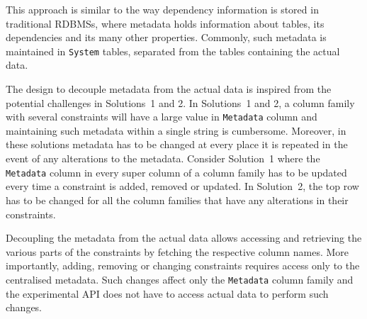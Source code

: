 This approach is similar to the way dependency information is
stored in traditional \acp{RDBMS},  where metadata holds information
about tables,  its dependencies and its many other properties.  Commonly,  such
metadata is maintained in \texttt{System} tables, separated from the
tables containing the actual data.  

The design to decouple metadata from the actual data is inspired from the
potential challenges in Solutions~1 and 2. 
In Solutions~1 and 2,   a column family with several constraints will have a
large value in \texttt{Metadata} column and maintaining such metadata within a
single string is cumbersome.
Moreover, in these solutions metadata has to be changed at every place it is repeated in the event of any alterations to
the metadata. 
Consider Solution~1 where the \texttt{Metadata} column in every super column
of a column family has to be updated every time a constraint is added,  removed
or updated. 
In Solution~2,  the top row has to be changed for all the column families that have
any alterations  in their constraints.   

Decoupling the metadata from the actual data allows accessing and retrieving
the various parts of the constraints by fetching  the respective column names.
More importantly,  adding, removing or changing constraints requires  access
only to the centralised metadata. Such changes affect only the \texttt{Metadata}
column family and the experimental \ac{API} does not have to access actual data
to perform such changes.









